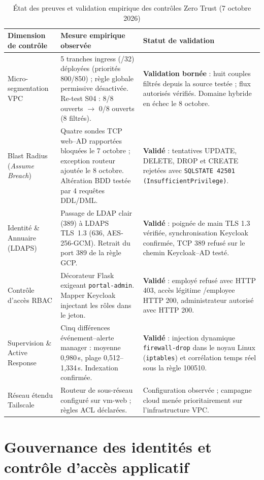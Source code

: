 \documentclass[a4paper,12pt]{report}
\begin{document}
\begin{table}[H]\centering\small
\caption{État des preuves et validation empirique des contrôles Zero Trust (7 octobre 2026)}
\label{tab:phase4-summary}
\begin{tabularx}{\textwidth}{p{3.2cm}p{3.8cm}Y}\toprule
\textbf{Dimension de contrôle} & \textbf{Mesure empirique observée} & \textbf{Statut de validation}\\\midrule
Micro-segmentation VPC & 5 tranches ingress (/32) déployées (priorités 800/850) ; règle globale permissive désactivée. Re-test S04 : 8/8 ouverts $\rightarrow$ 0/8 ouverts (8 filtrés). & \textbf{Validation bornée} : huit couples filtrés depuis la source testée ; flux autorisés vérifiés. Domaine hybride en échec le 8 octobre.\\
Blast Radius (\textit{Assume Breach}) & Quatre sondes TCP web--AD rapportées bloquées le 7 octobre ; exception routeur ajoutée le 8 octobre. Altération BDD testée par 4 requêtes DDL/DML. & \textbf{Validé} : tentatives UPDATE, DELETE, DROP et CREATE rejetées avec \texttt{SQLSTATE 42501 (InsufficientPrivilege)}.\\
Identité \& Annuaire (LDAPS) & Passage de LDAP clair (389) à LDAPS TLS~1.3 (636, AES-256-GCM). Retrait du port 389 de la règle GCP. & \textbf{Validé} : poignée de main TLS 1.3 vérifiée, synchronisation Keycloak confirmée, TCP 389 refusé sur le chemin Keycloak--AD testé.\\
Contrôle d'accès RBAC & Décorateur Flask exigeant \texttt{portal-admin}. Mapper Keycloak injectant les rôles dans le jeton. & \textbf{Validé} : employé refusé avec HTTP 403, accès légitime /employee HTTP 200, administrateur autorisé avec HTTP 200.\\
Supervision \& Active Response & Cinq différences événement--alerte manager : moyenne 0,980\,s, plage 0,512--1,334\,s. Indexation confirmée. & \textbf{Validé} : injection dynamique \texttt{firewall-drop} dans le noyau Linux (\texttt{iptables}) et corrélation temps réel sous la règle 100510.\\
Réseau étendu Tailscale & Routeur de sous-réseau configuré sur vm-web ; règles ACL déclarées. & Configuration observée ; campagne cloud menée prioritairement sur l'infrastructure VPC.\\\bottomrule
\end{tabularx}\end{table}

\section{Gouvernance des identités et contrôle d'accès applicatif}
\label{sec:p4-iam}
\end{document}
